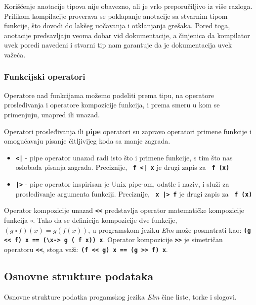 \documentclass[12pt,oneside]{memoir}
\begin{document}
Korišćenje anotacije tipova nije obavezno, ali je vrlo preporučiljivo iz više razloga.
Prilikom kompilacije proverava se poklapanje anotacije sa stvarnim tipom funkcije, što
dovodi do lakšeg uočavanja i otklanjanja grešaka. Pored toga, anotacije predsavljaju veoma
dobar vid dokumentacije, a činjenica da kompilator uvek poredi navedeni i stvarni tip nam
garantuje da je dokumentacija uvek važeća.

\subsubsection{Funkcijski operatori}
Operatore nad funkcijama možemo podeliti prema tipu, na operatore prosleđivanja i operatore
kompozicije funkcija, i prema smeru u kom se primenjuju, unapred ili unazad.

Operatori prosleđivanja ili \textbf{pipe} operatori su zapravo operatori primene funkcije
i omogućavaju pisanje čitljivijeg koda sa manje zagrada.
\begin{itemize}
  \item \texttt{\textbf{<|}} - pipe operator unazad radi isto što i primene funkcije, 
  s tim što nas oslobađa pisanja zagrada. Preciznije, \texttt{\textbf{ f <| x}} je drugi zapis
  za \texttt{\textbf{ f (x)}}
  \item \texttt{\textbf{|>}} - pipe operator inspirisan je Unix pipe-om, odatle i
  naziv, i služi za prosleđivanje argumenta funkciji. Preciznije,  \texttt{\textbf{ x |> f}}
  je drugi zapis za \texttt{\textbf{ f (x)}}
\end{itemize}

Operator kompozicije unazad \texttt{\textbf{<\smallskip<}} predstavlja operator matematičke 
kompozicije funkcija \(\circ\). Tako da se definicija kompozicije dve funkcije, \((g \circ f)(x) = g(f(x))\),
u programskom jeziku \emph{Elm} može posmatrati kao: \texttt{\textbf{(g <\smallskip< f) x == (\textbackslash x\textunderscore ->
g ( f x\textunderscore)) x}}. Operator kompozicije \texttt{\textbf{>\smallskip>}} je
simetričan operatoru \texttt{\textbf{<\smallskip<}}, stoga važi: \texttt{\textbf{(f <\smallskip< g) x == (g >\smallskip> f) x}}.

\subsection{Osnovne strukture podataka}
Osnovne strukture podatka progamskog jezika \emph{Elm} čine liste, torke i slogovi. 
\end{document}
